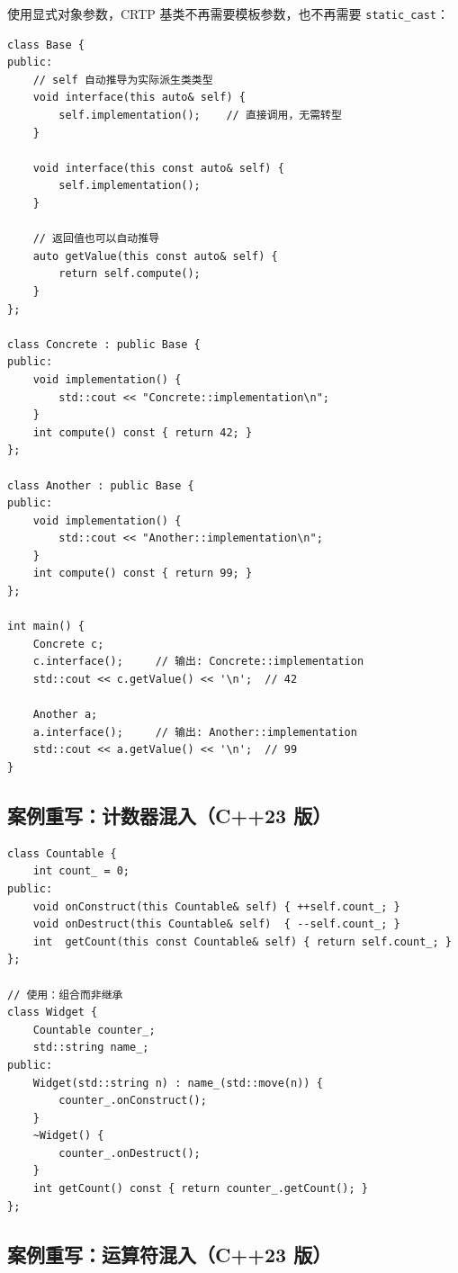 \documentclass[12pt,a4paper,fontset=fandol]{ctexbook}
\begin{document}
使用显式对象参数，CRTP 基类不再需要模板参数，也不再需要 \texttt{static\_cast}：

\begin{lstlisting}[caption={C++23 无模板 CRTP}]
class Base {
public:
    // self 自动推导为实际派生类类型
    void interface(this auto& self) {
        self.implementation();    // 直接调用，无需转型
    }

    void interface(this const auto& self) {
        self.implementation();
    }

    // 返回值也可以自动推导
    auto getValue(this const auto& self) {
        return self.compute();
    }
};

class Concrete : public Base {
public:
    void implementation() {
        std::cout << "Concrete::implementation\n";
    }
    int compute() const { return 42; }
};

class Another : public Base {
public:
    void implementation() {
        std::cout << "Another::implementation\n";
    }
    int compute() const { return 99; }
};

int main() {
    Concrete c;
    c.interface();     // 输出: Concrete::implementation
    std::cout << c.getValue() << '\n';  // 42

    Another a;
    a.interface();     // 输出: Another::implementation
    std::cout << a.getValue() << '\n';  // 99
}
\end{lstlisting}

\subsection{案例重写：计数器混入（C++23 版）}

\begin{lstlisting}[caption={C++23 计数器混入——无模板}]
class Countable {
    int count_ = 0;
public:
    void onConstruct(this Countable& self) { ++self.count_; }
    void onDestruct(this Countable& self)  { --self.count_; }
    int  getCount(this const Countable& self) { return self.count_; }
};

// 使用：组合而非继承
class Widget {
    Countable counter_;
    std::string name_;
public:
    Widget(std::string n) : name_(std::move(n)) {
        counter_.onConstruct();
    }
    ~Widget() {
        counter_.onDestruct();
    }
    int getCount() const { return counter_.getCount(); }
};
\end{lstlisting}

\subsection{案例重写：运算符混入（C++23 版）}
\end{document}

